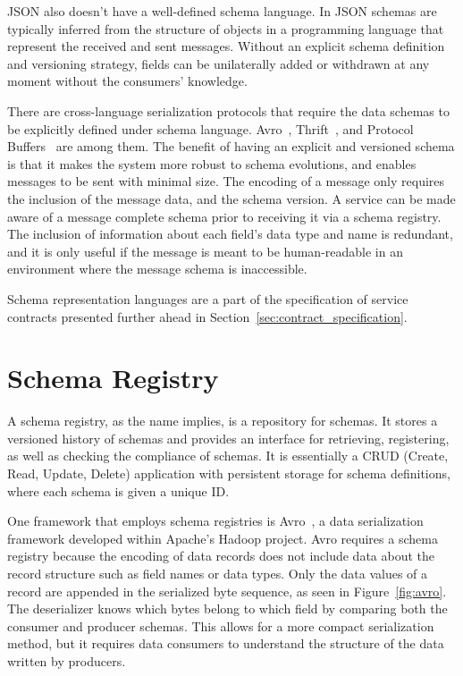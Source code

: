 JSON also doesn't have a well-defined schema language.
In JSON schemas are typically inferred from the structure of objects in a programming language that represent the received and sent messages.
Without an explicit schema definition and versioning strategy, fields can be unilaterally added or withdrawn at any moment without the consumers' knowledge.

There are cross-language serialization protocols that require the data schemas to be explicitly defined under schema language.
Avro~\cite{8}, Thrift~\cite{9}, and Protocol Buffers~\cite{10} are among them.
The benefit of having an explicit and versioned schema is that it makes the system more robust to schema evolutions, and
enables messages to be sent with minimal size.
The encoding of a message only requires the inclusion of the message data, and the schema version.
A service can be made aware of a message complete schema prior to receiving it via a schema registry.
The inclusion of information about each field's data type and name is redundant,
and it is only useful if the message is meant to be human-readable in an environment where the message schema is inaccessible.

Schema representation languages are a part of the specification of service contracts
presented further ahead in Section~\ref{sec:contract_specification}.

\section{Schema Registry} %
\label{sec:schema_registry}

A schema registry, as the name implies, is a repository for schemas.
It stores a versioned history of schemas and provides an interface for retrieving, registering, as well as checking the compliance of schemas.
It is essentially a CRUD (Create, Read, Update, Delete) application with persistent storage for schema definitions, where each schema is given a unique ID.

One framework that employs schema registries is Avro~\cite{8}, a data serialization framework developed within Apache's Hadoop project.
Avro requires a schema registry because the encoding of data records does not include data about the record structure such as field names or data types.
Only the data values of a record are appended in the serialized byte sequence, as seen in Figure~\ref{fig:avro}.
The deserializer knows which bytes belong to which field by comparing both the consumer and producer schemas.
This allows for a more compact serialization method, but it requires data consumers to understand the structure of the data written by producers.

